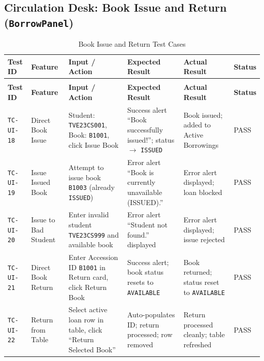 \subsection{Circulation Desk: Book Issue and Return (\texttt{BorrowPanel})}
{\footnotesize
\setlength{\tabcolsep}{3pt}
\begin{longtable}{>{\raggedright\arraybackslash}p{1.6cm} >{\raggedright\arraybackslash}p{2.1cm} >{\raggedright\arraybackslash}p{2.5cm} >{\raggedright\arraybackslash}p{3.1cm} >{\raggedright\arraybackslash}p{3.1cm} >{\centering\arraybackslash}p{1.4cm}}
\caption{Book Issue and Return Test Cases} \label{tab:test_ui_circ} \\
\toprule
\textbf{Test ID} & \textbf{Feature} & \textbf{Input / Action} & \textbf{Expected Result} & \textbf{Actual Result} & \textbf{Status} \\
\midrule
\endfirsthead
\multicolumn{6}{c}{{\bfseries Table \thetable\ continued from previous page}} \\
\toprule
\textbf{Test ID} & \textbf{Feature} & \textbf{Input / Action} & \textbf{Expected Result} & \textbf{Actual Result} & \textbf{Status} \\
\midrule
\endhead
\bottomrule
\endfoot
\texttt{TC-UI-18} & Direct Book Issue & Student: \texttt{TVE23CS001}, Book: \texttt{B1001}, click Issue Book & Success alert ``Book successfully issued!''; status $\to$ \texttt{ISSUED} & Book issued; added to Active Borrowings & PASS \\
\midrule
\texttt{TC-UI-19} & Issue Issued Book & Attempt to issue book \texttt{B1003} (already \texttt{ISSUED}) & Error alert ``Book is currently unavailable (ISSUED).'' & Error alert displayed; loan blocked & PASS \\
\midrule
\texttt{TC-UI-20} & Issue to Bad Student & Enter invalid student \texttt{TVE23CS999} and available book & Error alert ``Student not found.'' displayed & Error alert displayed; issue rejected & PASS \\
\midrule
\texttt{TC-UI-21} & Direct Book Return & Enter Accession ID \texttt{B1001} in Return card, click Return Book & Success alert; book status resets to \texttt{AVAILABLE} & Book returned; status reset to \texttt{AVAILABLE} & PASS \\
\midrule
\texttt{TC-UI-22} & Return from Table & Select active loan row in table, click ``Return Selected Book'' & Auto-populates ID; return processed; row removed & Return processed cleanly; table refreshed & PASS \\
\end{longtable}
}

